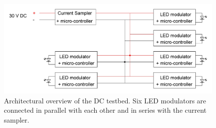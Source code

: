 \begin{figure}[htb]
  \centering
  \includegraphics[angle=0,width=\textwidth,keepaspectratio]{chapters/hardware-chapters/dc-test-bed-architectural.JPG}
  \caption{Architectural overview of the DC testbed. Six LED modulators are connected in parallel with each other and in series with the current sampler.}
  \label{fig:dc-test-bed-architectural}
\end{figure}














